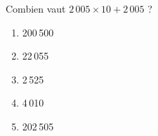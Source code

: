 Combien vaut $2\,005\times10+2\,005$ ?
\begin{multicols}{5}
  \begin{enumerate}[A/]
  \item 200\,500
  \item 22\,055
  \item 2\,525
  \item 4\,010
  \item 202\,505
  \end{enumerate}
\end{multicols}